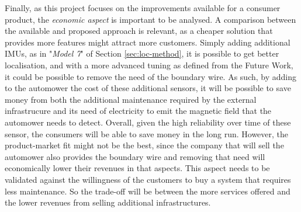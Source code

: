 Finally, as this project focuses on the improvements available for a consumer product, the \textit{economic aspect} is important to be analysed.
A comparison between the available and proposed approach is relevant, as a cheaper solution that provides more features might attract more customers.
Simply adding additional IMUs, as in "\textit{Model 7}" of Section \ref{sec:loc-method}, it is possible to get better localisation, and with a more advanced tuning as defined from the Future Work, it could be possible to remove the need of the boundary wire.
As such, by adding to the automower the cost of these additional sensors, it will be possible to save money from both the additional maintenance required by the external infrastrucure and its need of electricity to emit the magnetic field that the automower needs to detect.
Overall, given the high reliability over time of these sensor, the consumers will be able to save money in the long run.
However, the product-market fit might not be the best, since the company that will sell the automower also provides the boundary wire and removing that need will economically lower their revenues in that aspects. 
This aspect needs to be validated against the willingness of the customers to buy a system that requires less maintenance.
So the trade-off will be between the more services offered and the lower revenues from selling additional infrastructures.



\cleardoublepage
